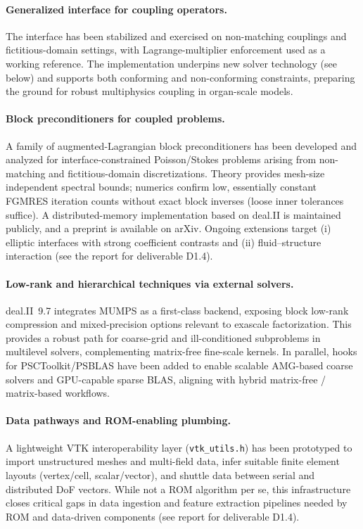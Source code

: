 \documentclass[a4paper,12pt]{article}
\begin{document}
\paragraph{Generalized interface for coupling operators.}
The interface has been stabilized and exercised on non-matching couplings and
fictitious-domain settings, with Lagrange-multiplier enforcement used as a
working reference. The implementation underpins new solver technology (see
below) and supports both conforming and non-conforming constraints, preparing
the ground for robust multiphysics coupling in organ-scale models.

\paragraph{Block preconditioners for coupled problems.}
A family of augmented-Lagrangian block preconditioners has been developed and
analyzed for interface-constrained Poisson/Stokes problems arising from
non-matching and fictitious-domain discretizations. Theory provides mesh-size
independent spectral bounds; numerics confirm low, essentially constant FGMRES
iteration counts without exact block inverses (loose inner tolerances suffice).
A distributed-memory implementation based on deal.II is maintained publicly, and
a preprint is available on arXiv. Ongoing extensions target (i) elliptic
interfaces with strong coefficient contrasts and (ii) fluid–struc\-ture
interaction (see the report for deliverable D1.4).

\paragraph{Low-rank and hierarchical techniques via external solvers.}
deal.II~9.7 integrates MUMPS as a first-class backend, exposing block low-rank
compression and mixed-precision options relevant to exascale factorization.
This provides a robust path for coarse-grid and ill-conditioned subproblems in
multilevel solvers, complementing matrix-free fine-scale kernels. In parallel,
hooks for PSCToolkit/PSBLAS have been added to enable scalable AMG-based
coarse solvers and GPU-capable sparse BLAS, aligning with hybrid matrix-free /
matrix-based workflows.

\paragraph{Data pathways and ROM-enabling plumbing.}
A lightweight VTK interoperability layer (\texttt{vtk\_utils.h}) has been
prototyped to import unstructured meshes and multi-field data, infer suitable
finite element layouts (vertex/cell, scalar/vector), and shuttle data between
serial and distributed DoF vectors. While not a ROM algorithm per se, this
infrastructure closes critical gaps in data ingestion and feature extraction
pipelines needed by ROM and data-driven components (see report for deliverable
D1.4).
\end{document}
